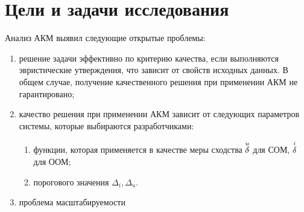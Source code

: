 \section{Цели и задачи исследования}
Анализ АКМ выявил следующие открытые проблемы:
		\begin{enumerate}
		\item решение задачи эффективно по критерию качества,
			если выполняются
			эвристические утверждения, что зависит от свойств исходных данных.
			В общем случае, получение качественного решения при применении АКМ
			не гарантировано;
		\item качество решения при применении АКМ зависит
			от следующих параметров системы, которые выбираются разработчиками:
				\begin{enumerate}
					\item функции, которая применяется в качестве меры сходства
				${\overset{u}{\mathcal{\delta}}}$ для СОМ, ${\overset{i}{\mathcal{\delta}}}$ для ООМ;
		\item порогового значения $\Delta_i, \Delta_u$.
				\end{enumerate}
		\item проблема масштабируемости
		\end{enumerate}

%
%
%
%
%
%
%
